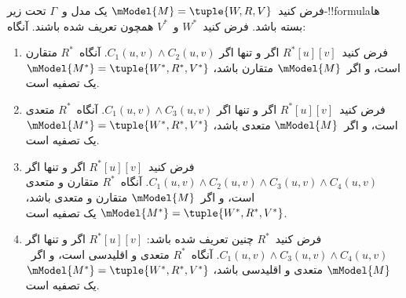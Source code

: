 \documentclass[../../../include/open-logic-section]{subfiles}
\begin{document}
\begin{thm}
  فرض کنید~$\mModel{M} =\tuple{W,R,V}$ یک مدل و~$\Gamma$ تحت
  زیر-!!{formula}ها بسته باشد. فرض کنید~$W^*$ و~$V^*$ همچون
   تعریف شده باشند. آنگاه:
  \begin{enumerate}
  \item فرض کنید~$R^*[u][v]$ اگر و تنها اگر $C_1(u, v) \land
    C_2(u,v)$. آنگاه~$R^*$ متقارن است، و اگر~$\mModel{M}$ متقارن باشد،
    $\mModel{M^*} = \tuple{W^*,R^*,V^*}$ یک تصفیه است.
  \item فرض کنید~$R^*[u][v]$ اگر و تنها اگر $C_1(u, v)
    \land C_3(u,v)$. آنگاه~$R^*$ متعدی است، و اگر~$\mModel{M}$ متعدی
    باشد، $\mModel{M^*}=\tuple{W^*,R^*,V^*}$ یک تصفیه است.
  \item فرض کنید~$R^*[u][v]$ اگر و تنها اگر $C_1(u, v) \land C_2(u,v)
    \land C_3(u,v) \land C_4(u,v)$. آنگاه~$R^*$ متقارن و متعدی است،
    و اگر~$\mModel{M}$ متقارن و متعدی باشد،
    $\mModel{M^*}=\tuple{W^*,R^*,V^*}$ یک تصفیه است.
  \item فرض کنید~$R^*$ چنین تعریف شده باشد: $R^*[u][v]$ اگر و تنها
    اگر $C_1(u, v) \land C_3(u,v) \land C_4(u,v)$. آنگاه~$R^*$
    متعدی و اقلیدسی است، و اگر~$\mModel{M}$ متعدی و اقلیدسی باشد،
    $\mModel{M^*}=\tuple{W^*,R^*,V^*}$ یک تصفیه است.
  \end{enumerate}
\end{thm}
\end{document}
